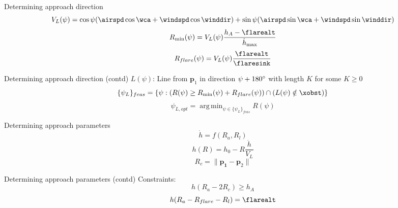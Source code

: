 \documentclass{beamer}
\renewcommand{\vec}[1]{
    \boldsymbol{#1}
}
\DeclareMathOperator*{\argmin}{arg\,\text{min}}
\begin{document}
\begin{frame}{Determining approach direction}
    \begin{equation}
        V_L(\psi)=\cos\psi(\airspd\cos\wca+\windspd\cos\winddir) + \sin\psi(\airspd\sin\wca+\windspd\sin\winddir)
    \end{equation}
    \begin{equation}
        R_{\text{min}}(\psi)=V_L(\psi)\frac{h_A-\flarealt}{\dot{h}_{\text{max}}}
    \end{equation}
    \begin{equation}
        R_{flare}(\psi)=V_{L}(\psi)\frac{\flarealt}{\flaresink}
    \end{equation}
\end{frame}

\begin{frame}{Determining approach direction (contd)}
    $L(\psi)$: Line from $\vec{p}_1$ in direction $\psi+180\degree$ with length $K$ for some $K\geq0$
    \begin{equation}
        \{\psi_L\}_{feas}=\{\psi: (R(\psi)\geq R_{\text{min}}(\psi)+R_{flare}(\psi)) \cap (L(\psi)\notin \xobst)\}
    \end{equation}
    \begin{equation}
        \psi_{L,opt} = \argmin_{\psi\in\{\psi_{L}\}_{feas}}R(\psi)
    \end{equation}
\end{frame}

\begin{frame}{Determining approach parameters}
    \begin{equation}
        \dot{h} = f(R_a, R_l)
    \end{equation}
    \begin{equation}
        h(R) = h_0 - R\frac{\dot{h}}{V_L}
    \end{equation}
    \begin{equation}
        R_c = \|\vec{p_1}-\vec{p}_2\|
    \end{equation}
\end{frame}

\begin{frame}{Determining approach parameters (contd)}
    Constraints:
    \begin{equation}\label{eq:h_a_constraint}
        h(R_a - 2R_c) \geq h_A
    \end{equation}
    \begin{equation}\label{eq:h_f_constraint}
        h(R_a - R_{flare} - R_l) = \flarealt
    \end{equation}
\end{frame}
\end{document}
